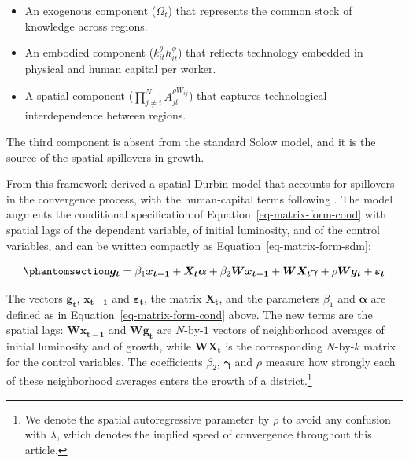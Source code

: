 \documentclass[
  a4paper, 
  twoside,
  final
]{article}
\providecommand{\tightlist}{%
  \setlength{\itemsep}{0pt}\setlength{\parskip}{0pt}}
\begin{document}
\begin{itemize}
\tightlist
\item
  An exogenous component (\(\Omega_t\)) that represents the common stock
  of knowledge across regions.
\item
  An embodied component (\(k_{i t}^{\theta} h_{i t}^{\phi}\)) that
  reflects technology embedded in physical and human capital per worker.
\item
  A spatial component (\(\prod_{j \neq i}^{N} A_{j t}^{\rho W_{i j}}\))
  that captures technological interdependence between regions.
\end{itemize}

The third component is absent from the standard Solow model, and it is
the source of the spatial spillovers in growth.

From this framework \citet{ertur_koch_spatial_growth} derived a spatial
Durbin model that accounts for spillovers in the convergence process,
with the human-capital terms following \citet{fischer_spatial_mrw}. The
model augments the conditional specification of
Equation~\ref{eq-matrix-form-cond} with spatial lags of the dependent
variable, of initial luminosity, and of the control variables, and can
be written compactly as Equation~\ref{eq-matrix-form-sdm}:

\begin{equation}\phantomsection\label{eq-matrix-form-sdm}{
\boldsymbol{g_t} =  \beta_1 \boldsymbol{x_{t-1}} + \boldsymbol{X_t} \boldsymbol{\alpha} + \beta_2 \boldsymbol{W} \boldsymbol{x_{t-1}} + \boldsymbol{W} \boldsymbol{X_t} \boldsymbol{\gamma} + \rho \boldsymbol{W} \boldsymbol{g_t}  + \boldsymbol{\varepsilon_t}
}\end{equation}

The vectors \(\boldsymbol{g_t}\), \(\boldsymbol{x_{t-1}}\) and
\(\boldsymbol{\varepsilon_t}\), the matrix \(\boldsymbol{X_t}\), and the
parameters \(\beta_1\) and \(\boldsymbol{\alpha}\) are defined as in
Equation~\ref{eq-matrix-form-cond} above. The new terms are the spatial
lags: \(\boldsymbol{W} \boldsymbol{x_{t-1}}\) and
\(\boldsymbol{W} \boldsymbol{g_t}\) are \(N\text{-by-}1\) vectors of
neighborhood averages of initial luminosity and of growth, while
\(\boldsymbol{W} \boldsymbol{X_t}\) is the corresponding
\(N\text{-by-}k\) matrix for the control variables. The coefficients
\(\beta_2\), \(\boldsymbol{\gamma}\) and \(\rho\) measure how strongly
each of these neighborhood averages enters the growth of a
district.\footnote{We denote the spatial autoregressive parameter by
  \(\rho\) to avoid any confusion with \(\lambda\), which denotes the
  implied speed of convergence throughout this article.}
\end{document}
